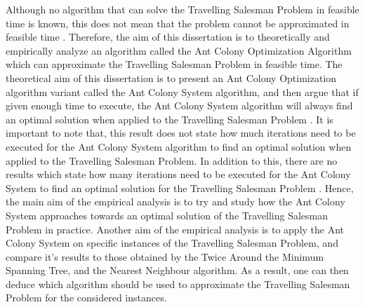 \documentclass[12pt]{article}
\numberwithin{equation}{subsection}
\numberwithin{table}{subsection}
\numberwithin{algorithm}{subsection}
\numberwithin{figure}{subsection}
\begin{document}
Although no algorithm that can solve the Travelling Salesman Problem in feasible time is known, this does not mean that the problem cannot be approximated in feasible time \cite{cormen_leiserson_rivest_stein}. Therefore, the aim of this dissertation is to theoretically and empirically analyze an algorithm called the Ant Colony Optimization Algorithm which can approximate the Travelling Salesman Problem in feasible time. The theoretical aim of this dissertation is to present an Ant Colony Optimization algorithm variant called the Ant Colony System algorithm, and then argue that if given enough time to execute, the Ant Colony System algorithm will always find an optimal solution when applied to the Travelling Salesman Problem \cite{dorigo_stutzle_thomas_2004}. It is important to note that, this result does not state how much iterations need to be executed for the  Ant Colony System algorithm to find an optimal solution when applied to the Travelling Salesman Problem. In addition to this, there are no results which state how many iterations need to be executed for the Ant Colony System to find an optimal solution for the Travelling Salesman Problem \cite{dorigo_stutzle_thomas_2004}. Hence, the main aim of the empirical analysis is to try and study how the Ant Colony System approaches towards an optimal solution of the Travelling Salesman Problem in practice. Another aim of the empirical analysis is to apply the Ant Colony System on specific instances of the Travelling Salesman Problem, and compare it's results to those obtained by the Twice Around the Minimum Spanning Tree, and the Nearest Neighbour algorithm. As a result, one can then deduce which algorithm should be used to approximate the Travelling Salesman Problem for the considered instances. \\\\
\end{document}
